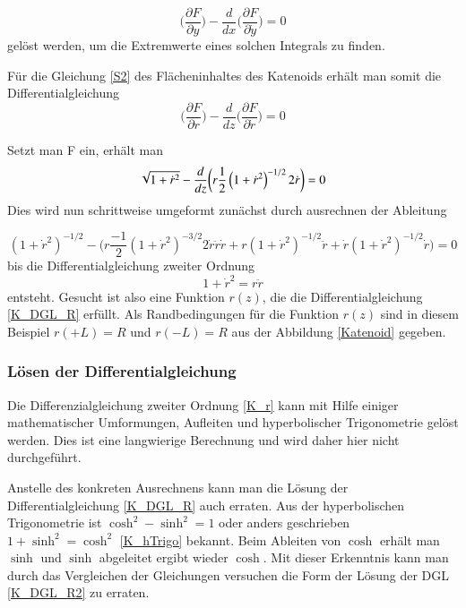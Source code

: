 \begin{refsection}
\begin{equation} \label{E_DGL2}
\bigg(\frac{\partial F}{\partial y}\bigg)- \frac{d}{dx} \bigg(\frac{\partial F}{\partial \dot{y}}\bigg)=0         
\end{equation}
gelöst werden, um die Extremwerte eines solchen Integrals zu finden.

Für die Gleichung \eqref{S2} des Flächeninhaltes des Katenoids  erhält man somit die Differentialgleichung
\begin{equation} \label{K_DGL1}
\bigg(\frac{\partial F}{\partial r}\bigg)- \frac{d}{dz} \bigg(\frac{\partial F}{\partial \dot{r}}\bigg)=0    
\end{equation}

Setzt man F ein, erhält man
\begin{equation} \label{K_DGL_H}
\sqrt{1+{\dot {r}}^2}-\frac{ d }{ dz } \bigg( r \frac{ 1 }{2  }\left( {1+{\dot {r}}^2}  \right)^{-1/2} 2 \dot {r}\bigg)=0
\\
\end{equation}
Dies wird nun schrittweise umgeformt zunächst durch ausrechnen der Ableitung

\begin{equation} \label{K_DGL_H2}
\left(1+{\dot {r}}^2  \right)^{-1/2}-\bigg(r \frac{ -1 }{2  } \left({1+{\dot {r}}^2}  \right)^{-3/2} 2 \dot{r} \ddot{r}  \dot{r}+ r \left({1+{\dot {r}}^2}  \right)^{-1/2} \ddot{r} +\dot{r} \left({1+{\dot {r}}^2}  \right)^{-1/2} \dot{r}\bigg)=0
\end{equation}
bis die Differentialgleichung zweiter Ordnung  
\begin{equation} \label{K_DGL_R}
1+{\dot {r}}^2=r  \ddot{r}
\end{equation}
entsteht. 
Gesucht ist also eine Funktion $r(z)$, die die Differentialgleichung \eqref{K_DGL_R} erfüllt. Als Randbedingungen für die Funktion $r(z)$ sind in diesem Beispiel $r(+L)=R$ und $r(-L)=R$ aus der Abbildung \ref{Katenoid} gegeben.

\subsubsection{Lösen der Differentialgleichung}
Die Differenzialgleichung zweiter Ordnung \eqref{K_r} kann mit Hilfe einiger mathematischer Umformungen, Aufleiten und hyperbolischer Trigonometrie gelöst werden. 
Dies ist eine langwierige Berechnung und wird daher hier nicht durchgeführt.

Anstelle des konkreten Ausrechnens kann man die Lösung der Differentialgleichung \eqref{K_DGL_R} auch erraten. 
Aus der hyperbolischen Trigonometrie ist $\cosh^2-\sinh^2=1$ oder anders geschrieben $1+\sinh^2=\cosh^2$ \eqref{K_hTrigo} bekannt. 
Beim Ableiten von $\cosh$ erhält man $\sinh$ und $\sinh$ abgeleitet ergibt wieder $\cosh$. 
Mit dieser Erkenntnis kann man durch das Vergleichen der Gleichungen versuchen die Form der Lösung der DGL \eqref{K_DGL_R2} zu erraten. 


\end{refsection}
